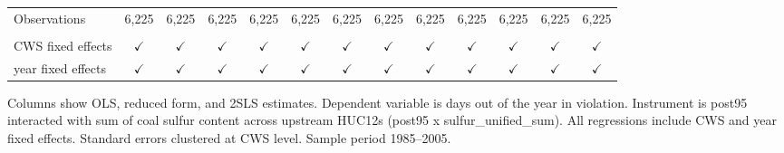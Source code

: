 \begin{table}[htbp]
\begin{adjustbox}{width = \textwidth, center}
\begin{tabular}{lcccccccccccc}
          \\
         
         Observations                                             & 6,225         & 6,225         & 6,225         & 6,225         & 6,225         & 6,225         & 6,225         & 6,225         & 6,225         & 6,225         & 6,225         & 6,225\\  
         
          \\
         
         CWS fixed effects                                        & $\checkmark$  & $\checkmark$  & $\checkmark$  & $\checkmark$  & $\checkmark$  & $\checkmark$  & $\checkmark$  & $\checkmark$  & $\checkmark$  & $\checkmark$  & $\checkmark$  & $\checkmark$\\   
         year fixed effects                                       & $\checkmark$  & $\checkmark$  & $\checkmark$  & $\checkmark$  & $\checkmark$  & $\checkmark$  & $\checkmark$  & $\checkmark$  & $\checkmark$  & $\checkmark$  & $\checkmark$  & $\checkmark$\\   
         
         \bottomrule
         
      \end{tabular}
      
      
      
   \end{adjustbox}
      {\tiny\linespread{1}\selectfont \par \raggedright 
   Columns show OLS, reduced form, and 2SLS estimates. Dependent variable is days out of the year in violation. Instrument is post95 interacted with sum of coal sulfur content across upstream HUC12s (post95 x sulfur\_unified\_sum). All regressions include CWS and year fixed effects. Standard errors clustered at CWS level. Sample period 1985--2005.}
   
\end{table}


